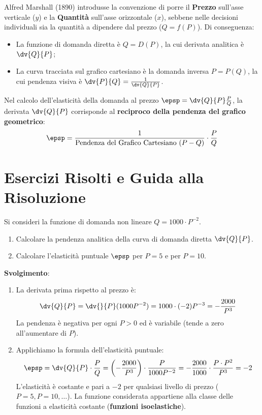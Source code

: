 \begin{esame}
Alfred Marshall (1890) introdusse la convenzione di porre il \textbf{Prezzo} sull'asse verticale ($y$) e la \textbf{Quantità} sull'asse orizzontale ($x$), sebbene nelle decisioni individuali sia la quantità a dipendere dal prezzo ($Q = f(P)$).
Di conseguenza:
\begin{itemize}
    \item La funzione di domanda diretta è $Q = D(P)$, la cui derivata analitica è $\dv{Q}{P}$;
    \item La curva tracciata sul grafico cartesiano è la domanda inversa $P = P(Q)$, la cui pendenza visiva è $\dv{P}{Q} = \frac{1}{\dv{Q}{P}}$.
\end{itemize}
Nel calcolo dell'elasticità della domanda al prezzo $\epsp = \dv{Q}{P} \frac{P}{Q}$, la derivata $\dv{Q}{P}$ corrisponde al \textbf{reciproco della pendenza del grafico geometrico}:
\begin{equation}
    \epsp = \frac{1}{\text{Pendenza del Grafico Cartesiano } (P-Q)} \cdot \frac{P}{Q}
\end{equation}
\end{esame}

\section{Esercizi Risolti e Guida alla Risoluzione}

\begin{esercizio}
Si consideri la funzione di domanda non lineare $Q = 1000 \cdot P^{-2}$.
\begin{enumerate}
    \item Calcolare la pendenza analitica della curva di domanda diretta $\dv{Q}{P}$.
    \item Calcolare l'elasticità puntuale $\epsp$ per $P = 5$ e per $P = 10$.
\end{enumerate}

\textbf{Svolgimento}:
\begin{enumerate}
    \item La derivata prima rispetto al prezzo è:
    \begin{equation}
        \dv{Q}{P} = \dv{}{P} (1000 P^{-2}) = 1000 \cdot (-2) P^{-3} = -\frac{2000}{P^3}
    \end{equation}
    La pendenza è negativa per ogni $P > 0$ ed è variabile (tende a zero all'aumentare di $P$).
    
    \item Applichiamo la formula dell'elasticità puntuale:
    \begin{equation}
        \epsp = \dv{Q}{P} \cdot \frac{P}{Q} = \left( -\frac{2000}{P^3} \right) \cdot \frac{P}{1000 P^{-2}} = -\frac{2000}{1000} \cdot \frac{P \cdot P^2}{P^3} = -2
    \end{equation}
    L'elasticità è costante e pari a $-2$ per qualsiasi livello di prezzo ($P=5, P=10, \dots$). La funzione considerata appartiene alla classe delle funzioni a elasticità costante (\textbf{funzioni isoelastiche}).
\end{enumerate}
\end{esercizio}


